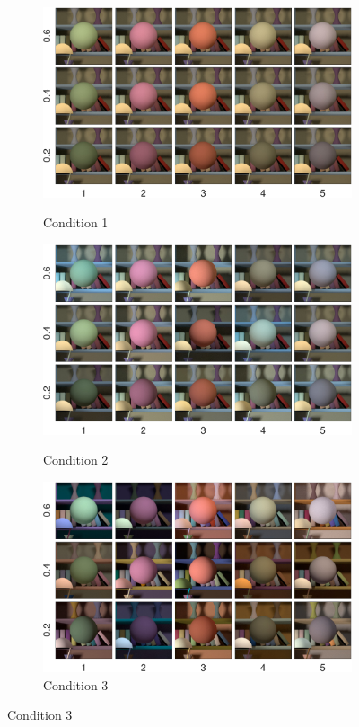 \documentclass{jov}
\begin{document}
\begin{figure}
\centering
	\begin{subfigure}[b]{0.33 \textwidth}
		\caption{Condition 1}
		\includegraphics[width=\textwidth]{../FiguresDraft4/Figure1/Figure1_b.pdf}
 		\label{fig:backgroundVarying}
	\end{subfigure}
	\begin{subfigure}[b]{0.33 \textwidth}
        \caption{Condition 2}	
        \includegraphics[width=\textwidth]{../FiguresDraft4/Figure2/Figure2_b.pdf}
        \label{fig:targetIlluminantVarying}
    \end{subfigure}
	\begin{subfigure}[b]{0.33 \textwidth}
	\caption{Condition 3}	
        \includegraphics[width=\textwidth]{../FiguresDraft4/Figure2/Figure2_c.pdf}        

\end{subfigure}
\end{figure}
\end{document}
